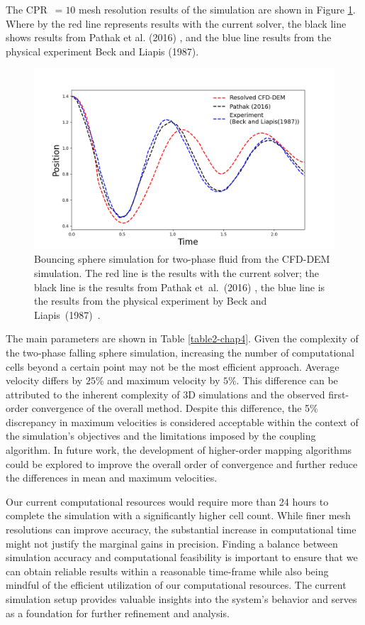 The CPR~$= 10$ mesh resolution results of the simulation are shown in Figure \ref{fig:2ph_exp}. Where by the red line represents results with the current solver, the black line shows results from Pathak et al. (2016) \cite{pathak20163d}, and the blue line results from the physical experiment Beck and Liapis (1987)\cite{beck1987transient}.
\begin{figure}[!ht]
    \centering
    \includegraphics[width=15cm]{Images/chap3/bouncing_sphere_plot.png}
    \caption{Bouncing sphere simulation for two-phase fluid from the CFD-DEM simulation. The red line is the results with the current solver; the black line is the results from Pathak et~al.~(2016) \cite{pathak20163d}, the blue line is the results from the physical experiment by Beck and Liapis~(1987)~\cite{beck1987transient}.}
    \label{fig:2ph_exp}
    \end{figure}
    
The main parameters are shown in Table \ref{table2-chap4}. Given the complexity of the two-phase falling sphere simulation, increasing the number of computational cells beyond a certain point may not be the most efficient approach. Average velocity differs by $25$\% and maximum velocity by $5$\%. This difference can be attributed to the inherent complexity of 3D simulations and the observed first-order convergence of the overall method. Despite this difference, the 5\% discrepancy in maximum velocities is considered acceptable within the context of the simulation's objectives and the limitations imposed by the coupling algorithm. In future work, the development of higher-order mapping algorithms could be explored to improve the overall order of convergence and further reduce the differences in mean and maximum velocities. 

Our current computational resources would require more than 24 hours to complete the simulation with a significantly higher cell count. While finer mesh resolutions can improve accuracy, the substantial increase in computational time might not justify the marginal gains in precision. Finding a balance between simulation accuracy and computational feasibility is important to ensure that we can obtain reliable results within a reasonable time-frame while also being mindful of the efficient utilization of our computational resources. The current simulation setup provides valuable insights into the system's behavior and serves as a foundation for further refinement and analysis.

